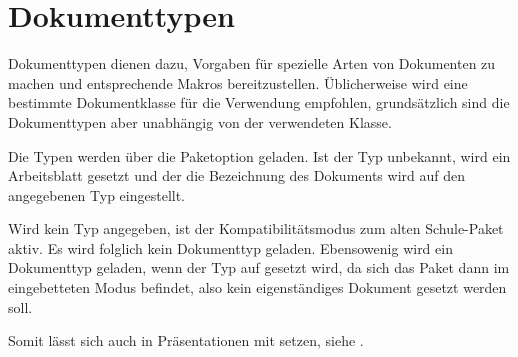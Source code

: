 \part{Dokumenttypen}
	\label{sec:typen}
	Dokumenttypen dienen dazu, Vorgaben für spezielle Arten von
	Dokumenten zu machen und entsprechende Makros bereitzustellen.
	Üblicherweise wird eine bestimmte Dokumentklasse für die
	Verwendung empfohlen, grundsätzlich sind die Dokumenttypen aber
	unabhängig von der verwendeten Klasse.

	Die Typen werden über die Paketoption  geladen.
	Ist der Typ unbekannt, wird ein Arbeitsblatt gesetzt und der
	die Bezeichnung des Dokuments wird auf den angegebenen Typ
	eingestellt.

	Wird kein Typ angegeben, ist der Kompatibilitätsmodus zum
	alten Schule-Paket aktiv. Es wird folglich kein Dokumenttyp
	geladen.
	Ebensowenig wird ein Dokumenttyp geladen, wenn der Typ auf
	 gesetzt wird, da sich das Paket dann im
	eingebetteten Modus befindet, also kein eigenständiges
	Dokument gesetzt werden soll.
  
  Somit lässt sich  auch in Präsentationen mit 
   setzen, siehe .
   
  

	
%	
	
%	
    
%	
	
	
    
    

	
